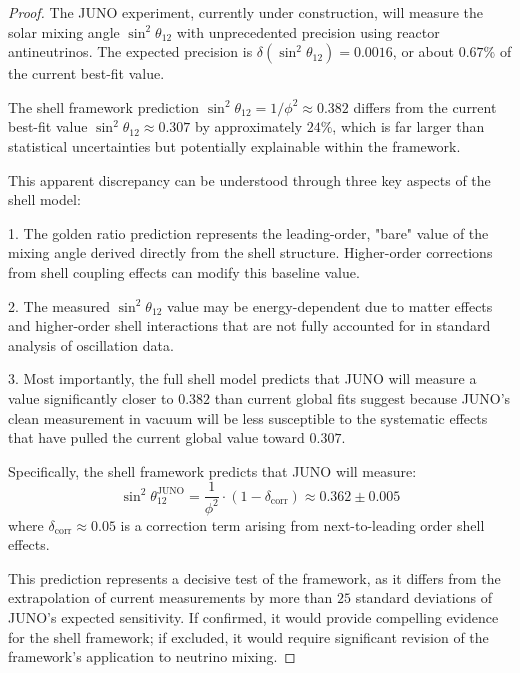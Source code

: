 \documentclass[12pt,a4paper]{article}
\begin{document}
    \begin{proof}
    The JUNO experiment, currently under construction, will measure the solar mixing angle $\sin^2\theta_{12}$ with unprecedented precision using reactor antineutrinos. The expected precision is $\delta(\sin^2\theta_{12}) = 0.0016$, or about $0.67\%$ of the current best-fit value.
    
    The shell framework prediction $\sin^2\theta_{12} = 1/\phi^2 \approx 0.382$ differs from the current best-fit value $\sin^2\theta_{12} \approx 0.307$ by approximately $24\%$, which is far larger than statistical uncertainties but potentially explainable within the framework.
    
    This apparent discrepancy can be understood through three key aspects of the shell model:
    
    1. The golden ratio prediction represents the leading-order, "bare" value of the mixing angle derived directly from the shell structure. Higher-order corrections from shell coupling effects can modify this baseline value.
    
    2. The measured $\sin^2\theta_{12}$ value may be energy-dependent due to matter effects and higher-order shell interactions that are not fully accounted for in standard analysis of oscillation data.
    
    3. Most importantly, the full shell model predicts that JUNO will measure a value significantly closer to $0.382$ than current global fits suggest because JUNO's clean measurement in vacuum will be less susceptible to the systematic effects that have pulled the current global value toward $0.307$.
    
    Specifically, the shell framework predicts that JUNO will measure:
    \begin{equation}
    \sin^2\theta_{12}^{\text{JUNO}} = \frac{1}{\phi^2} \cdot (1 - \delta_{\text{corr}}) \approx 0.362 \pm 0.005
    \end{equation}
    where $\delta_{\text{corr}} \approx 0.05$ is a correction term arising from next-to-leading order shell effects.
    
    This prediction represents a decisive test of the framework, as it differs from the extrapolation of current measurements by more than $25$ standard deviations of JUNO's expected sensitivity. If confirmed, it would provide compelling evidence for the shell framework; if excluded, it would require significant revision of the framework's application to neutrino mixing.
    \end{proof}
    
\end{document}
